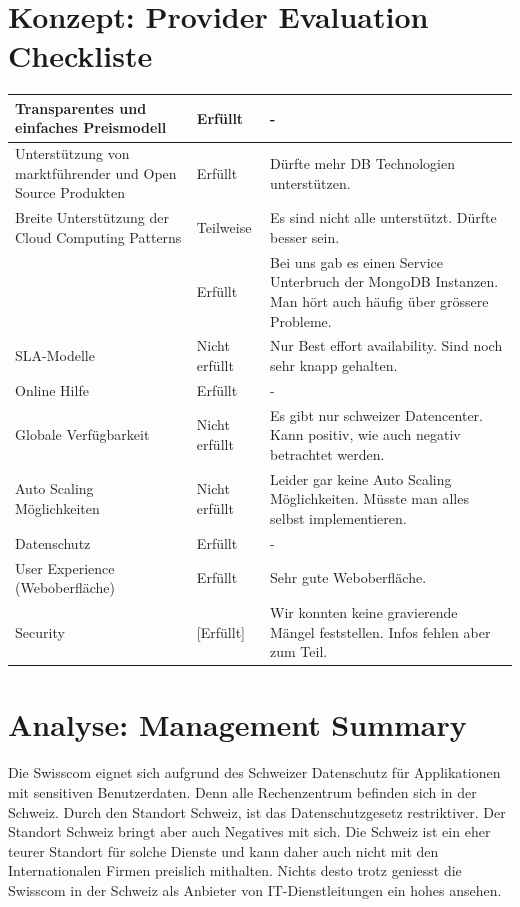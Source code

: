 \chapter{Konzept: Provider Evaluation Checkliste}
\begin{table}[H]
\begin{tabular}{|p{}|l|p{}|}
\hline 
Transparentes und einfaches Preismodell & Erfüllt & - \\ 
\hline 
Unterstützung von marktführender und Open Source Produkten & Erfüllt & Dürfte mehr DB Technologien unterstützen. \\ 
\hline 
Breite Unterstützung der Cloud Computing Patterns  & Teilweise & Es sind nicht alle unterstützt. Dürfte besser sein. \\ 
\hline 
[Stabilität] & Erfüllt &  Bei uns gab es einen Service Unterbruch der MongoDB Instanzen. Man hört auch häufig über grössere Probleme. \\ 
\hline 
SLA-Modelle & Nicht erfüllt & Nur Best effort availability. Sind noch sehr knapp gehalten.\\ 
\hline 
Online Hilfe & Erfüllt & - \\ 
\hline 
Globale Verfügbarkeit & Nicht erfüllt & Es gibt nur schweizer Datencenter. Kann positiv, wie auch negativ betrachtet werden.\\ 
\hline 
Auto Scaling Möglichkeiten & Nicht erfüllt & Leider gar keine Auto Scaling Möglichkeiten. Müsste man alles selbst implementieren. \\ 
\hline 
Datenschutz & Erfüllt & - \\ 
\hline 
User Experience (Weboberfläche) & Erfüllt & Sehr gute Weboberfläche. \\ 
\hline 
Security & [Erfüllt] & Wir konnten keine gravierende Mängel feststellen. Infos fehlen aber zum Teil. \\ 
\hline 
\end{tabular} 
\end{table}

\chapter{Analyse: Management Summary}
Die Swisscom eignet sich aufgrund des Schweizer Datenschutz für Applikationen mit sensitiven Benutzerdaten. Denn alle Rechenzentrum befinden sich in der Schweiz. Durch den Standort Schweiz, ist das Datenschutzgesetz restriktiver. Der Standort Schweiz bringt aber auch Negatives mit sich. Die Schweiz ist ein eher teurer Standort für solche Dienste und kann daher auch nicht mit den Internationalen Firmen preislich mithalten. Nichts desto trotz geniesst die Swisscom in der Schweiz als Anbieter von IT-Dienstleitungen ein hohes ansehen.

